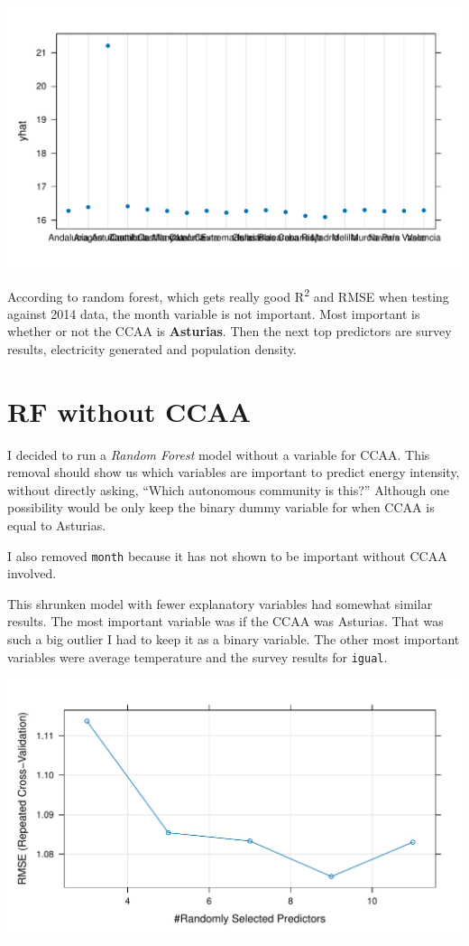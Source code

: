 \documentclass[
]{report}
\begin{document}
\includegraphics{Modelling_Energy_Intensity-V3_files/figure-pdf/unnamed-chunk-3-5.pdf}

According to random forest, which gets really good R\textsuperscript{2}
and RMSE when testing against 2014 data, the month variable is not
important. Most important is whether or not the CCAA is
\textbf{Asturias}. Then the next top predictors are survey results,
electricity generated and population density.

\hypertarget{rf-without-ccaa}{%
\section{RF without CCAA}\label{rf-without-ccaa}}

I decided to run a \emph{Random Forest} model without a variable for
CCAA. This removal should show us which variables are important to
predict energy intensity, without directly asking, ``Which autonomous
community is this?'' Although one possibility would be only keep the
binary dummy variable for when CCAA is equal to Asturias.

I also removed \texttt{month} because it has not shown to be important
without CCAA involved.

This shrunken model with fewer explanatory variables had somewhat
similar results. The most important variable was if the CCAA was
Asturias. That was such a big outlier I had to keep it as a binary
variable. The other most important variables were average temperature
and the survey results for \texttt{igual}.

\includegraphics{Modelling_Energy_Intensity-V3_files/figure-pdf/unnamed-chunk-5-1.pdf}
\end{document}
